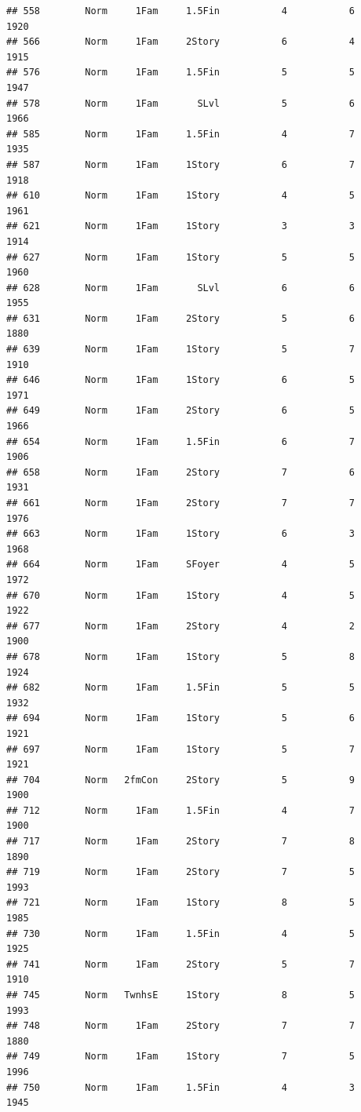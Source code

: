 \documentclass[]{article}
\begin{document}
\begin{verbatim}
## 558        Norm     1Fam     1.5Fin           4           6      1920
## 566        Norm     1Fam     2Story           6           4      1915
## 576        Norm     1Fam     1.5Fin           5           5      1947
## 578        Norm     1Fam       SLvl           5           6      1966
## 585        Norm     1Fam     1.5Fin           4           7      1935
## 587        Norm     1Fam     1Story           6           7      1918
## 610        Norm     1Fam     1Story           4           5      1961
## 621        Norm     1Fam     1Story           3           3      1914
## 627        Norm     1Fam     1Story           5           5      1960
## 628        Norm     1Fam       SLvl           6           6      1955
## 631        Norm     1Fam     2Story           5           6      1880
## 639        Norm     1Fam     1Story           5           7      1910
## 646        Norm     1Fam     1Story           6           5      1971
## 649        Norm     1Fam     2Story           6           5      1966
## 654        Norm     1Fam     1.5Fin           6           7      1906
## 658        Norm     1Fam     2Story           7           6      1931
## 661        Norm     1Fam     2Story           7           7      1976
## 663        Norm     1Fam     1Story           6           3      1968
## 664        Norm     1Fam     SFoyer           4           5      1972
## 670        Norm     1Fam     1Story           4           5      1922
## 677        Norm     1Fam     2Story           4           2      1900
## 678        Norm     1Fam     1Story           5           8      1924
## 682        Norm     1Fam     1.5Fin           5           5      1932
## 694        Norm     1Fam     1Story           5           6      1921
## 697        Norm     1Fam     1Story           5           7      1921
## 704        Norm   2fmCon     2Story           5           9      1900
## 712        Norm     1Fam     1.5Fin           4           7      1900
## 717        Norm     1Fam     2Story           7           8      1890
## 719        Norm     1Fam     2Story           7           5      1993
## 721        Norm     1Fam     1Story           8           5      1985
## 730        Norm     1Fam     1.5Fin           4           5      1925
## 741        Norm     1Fam     2Story           5           7      1910
## 745        Norm   TwnhsE     1Story           8           5      1993
## 748        Norm     1Fam     2Story           7           7      1880
## 749        Norm     1Fam     1Story           7           5      1996
## 750        Norm     1Fam     1.5Fin           4           3      1945

\end{verbatim}
\end{document}
